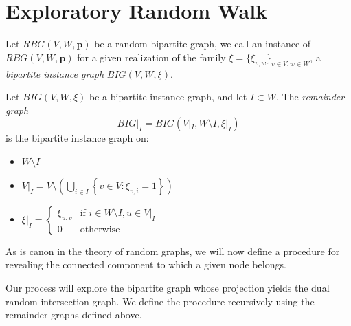 \section{Exploratory Random Walk}\label{sec:erw}

\begin{defn}\label{defn:big}
    Let $RBG(V,W,\mathbf{p})$ be a random bipartite graph, we call an instance of $RBG(V,W,\mathbf{p})$ for a given
    realization of the family $\xi = \{\xi_{v,w}\}_{v\in V, w\in W}$, a \emph{bipartite instance graph}
    $BIG(V,W,\xi)$.
\end{defn}

\begin{defn}\label{defn:remainder}
    Let $BIG(V,W,\xi)$ be a bipartite instance graph, and let $I \subset W$.
    The \emph{remainder graph} \[BIG|_{I} = BIG(V|_{I}, W\setminus I, \xi|_{I})\] is the bipartite instance graph on:
    \begin{itemize}
        \item $W\setminus I$
        \item $\displaystyle V|_{I} = V \setminus \left(\bigcup_{i\in I} \left\{v \in V\colon \xi_{v,i}=1 \right\}\right)$
        \item $\displaystyle \xi|_{I} = \left\{ \begin{array}{cc}
                                                    \xi_{u,v} & \textrm{if } i \in W\setminus I, u \in V|_{I}\\
                                                    0 & \textrm{otherwise}
        \end{array}\right.$
    \end{itemize}
\end{defn}

As is canon in the theory of random graphs\cite{bHofstad2017v1, bGrimmett2010, bAlonSpencer2008}, we will now define a
procedure for revealing the connected component to which a given node belongs.

Our process will explore the bipartite graph whose projection yields the dual random intersection graph.
We define the procedure recursively using the remainder graphs defined above.

